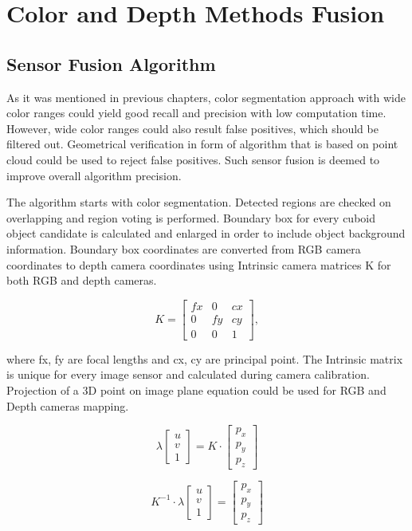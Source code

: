 \documentclass{ctuthesis}
\begin{document}
\chapter{Color and Depth Methods Fusion}
\section{Sensor Fusion Algorithm}

As it was mentioned in previous chapters, color segmentation approach with wide color ranges could yield good recall and precision with low computation time. However, wide color ranges could also result false positives, which should be filtered out. Geometrical verification in form of algorithm that is based on point cloud could be used to reject false positives. Such sensor fusion is deemed to improve overall algorithm precision. 

The algorithm starts with color segmentation. Detected regions are checked on overlapping and region voting is performed. Boundary box for every cuboid object candidate is calculated and enlarged in order to include object background information. Boundary box coordinates are converted from RGB camera coordinates to depth camera coordinates using Intrinsic camera matrices K for both RGB and depth cameras.


\[K = \begin{bmatrix}
fx & 0 & cx\\
0 & fy & cy\\
0 & 0 & 1
\end{bmatrix}, \]

where fx, fy are focal lengths and cx, cy are principal point. The Intrinsic matrix is unique for every image sensor and calculated during camera calibration. Projection of a 3D point on image plane equation could be used for RGB and Depth cameras mapping.

\[ \lambda \begin{bmatrix}
u\\
v\\
1
\end{bmatrix} = K \cdot \begin{bmatrix}
p_x\\
p_y\\
p_z
\end{bmatrix} \]

\[ K^{-1} \cdot \lambda \begin{bmatrix}
u\\
v\\
1
\end{bmatrix} = \begin{bmatrix}
p_x\\
p_y\\
p_z
\end{bmatrix}\]
\end{document}

